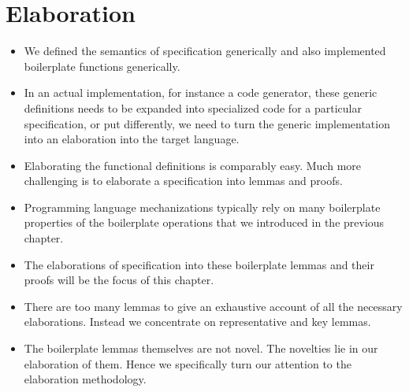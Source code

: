 \chapter{Elaboration}\label{ch:elaboration}

\begin{itemize}
\item We defined the semantics of \Knot specification generically and also
  implemented boilerplate functions generically.
\item In an actual implementation, for instance a code generator, these generic
  definitions needs to be expanded into specialized code for a particular
  specification, or put differently, we need to turn the generic implementation
  into an elaboration into the target language.
\item Elaborating the functional definitions is comparably easy. Much more
  challenging is to elaborate a specification into lemmas and proofs.
\item Programming language mechanizations typically rely on many boilerplate
  properties of the boilerplate operations that we introduced in the previous
  chapter.
\item The elaborations of specification into these boilerplate lemmas and their
  proofs will be the focus of this chapter.
\item There are too many lemmas to give an exhaustive account of all the
  necessary elaborations. Instead we concentrate on representative and key
  lemmas.
\item The boilerplate lemmas themselves are not novel. The novelties lie in our
  elaboration of them. Hence we specifically turn our attention to the
  elaboration methodology.
\end{itemize}

